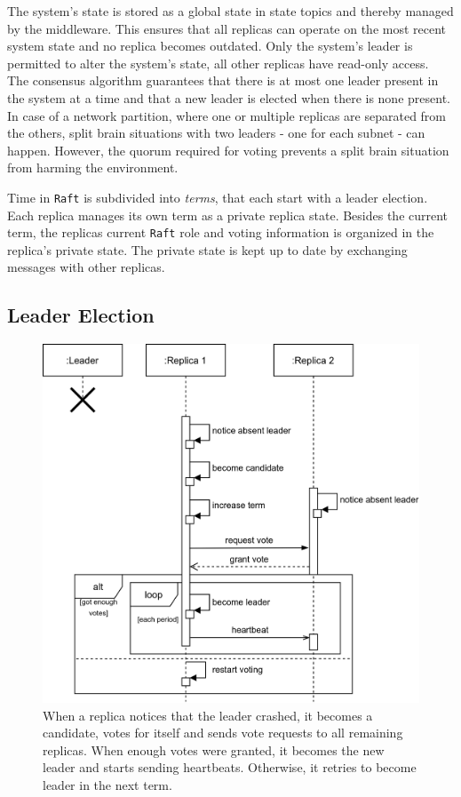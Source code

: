 The system's state is stored as a global state in  state topics and thereby managed by the middleware.
This ensures that all replicas can operate on the most recent system state and no replica becomes outdated.
Only the system's leader is permitted to alter the system's state, all other replicas have read-only access.
\\

The consensus algorithm guarantees that there is at most one leader present in the system at a time and that a new leader is elected when there is none present.
In case of a network partition, where one or multiple replicas are separated from the others, split brain situations with two leaders - one for each subnet - can happen.
However, the quorum required for voting prevents a split brain situation from harming the environment.

Time in \texttt{Raft} is subdivided into \textit{terms}, that each start with a leader election.
Each replica manages its own term as a private replica state.
Besides the current term, the replicas current \texttt{Raft} role and voting information is organized in the replica's private state.
The private state is kept up to date by exchanging messages with other replicas.

\subsection{Leader Election}
\begin{figure}[!hb]
	\centering
	\includegraphics[width=0.75\linewidth]{images/sequence/LeaderElection}
	\caption{When a replica notices that the leader crashed, it becomes a candidate, votes for itself and sends vote requests to all remaining replicas. When enough votes were granted, it becomes the new leader and starts sending heartbeats. Otherwise, it retries to become leader in the next term.}
	\label{fig:SeqLeaderElection}
\end{figure}

